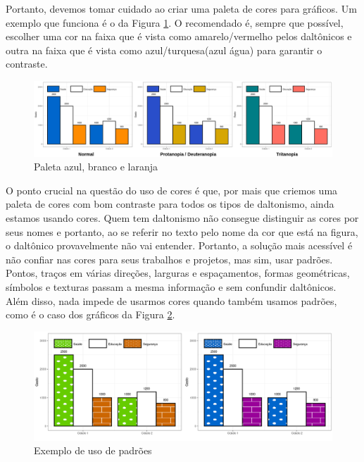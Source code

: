 \documentclass[12pt]{article}   %
\begin{document}
    	\par Portanto, devemos tomar cuidado ao criar uma paleta de cores para gráficos. Um exemplo que funciona é o da Figura \ref{fig:azullaranja}. O recomendado é, sempre que possível, escolher uma cor na faixa que é vista como amarelo/vermelho pelos daltônicos e outra na faixa que é vista como azul/turquesa(azul água) para garantir o contraste.
    	
    		\begin{figure}[h!]
    			\centering
    			\caption{Paleta azul, branco e laranja}
    			\label{fig:azullaranja}
    			\vspace{+12pt}
    			\includegraphics[scale=0.3]{AzulLaranja}
    		\end{figure}
    	\vspace{+16pt}
    	
    	\par O ponto crucial na questão do uso de cores é que, por mais que criemos uma paleta de cores com bom contraste para todos os tipos de daltonismo, ainda estamos usando cores. Quem tem daltonismo não consegue distinguir as cores por seus nomes e portanto, ao se referir no texto pelo nome da cor que está na figura, o daltônico provavelmente não vai entender. Portanto, a solução mais acessível é não confiar nas cores para seus trabalhos e projetos, mas sim, usar padrões. Pontos, traços em várias direções, larguras e espaçamentos, formas geométricas, símbolos e texturas passam a mesma informação e sem confundir daltônicos. Além disso, nada impede de usarmos cores quando também usamos padrões, como é o caso dos gráficos da Figura \ref{fig:padrao}.
    	
    		\begin{figure}[h!]
    			\centering
    			\caption{Exemplo de uso de padrões}
    			\label{fig:padrao}
    			\vspace{+12pt}
    			\includegraphics[scale=0.3]{padrao}
    		\end{figure}
\end{document}
